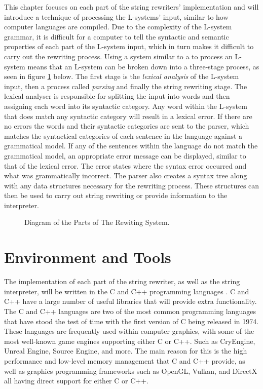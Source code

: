 This chapter focuses on each part of the string rewriters' implementation and will introduce a technique of processing the L-systems' input, similar to how computer languages are compiled. Due to the complexity of the L-system grammar, it is difficult for a computer to tell the syntactic and semantic properties of each part of the L-system input, which in turn makes it difficult to carry out the rewriting process. Using a system similar to a  to process an L-system means that an L-system  can be broken down into a three-stage process, as seen in figure \ref{3D rotations} below. The first stage is the \textit{lexical analysis} of the L-system input, then a process called \textit{parsing} and finally the string rewriting stage. The lexical analyser is responsible for splitting the input into words and then assigning each word into its syntactic category. Any word within the L-system that does match any syntactic category will result in a lexical error. If there are no errors the words and their syntactic categories are sent to the parser, which matches the syntactical categories of each sentence in the language against a grammatical model. If any of the sentences within the language do not match the grammatical model, an appropriate error message can be displayed, similar to that of the lexical error. The error states where the syntax error occurred and what was grammatically incorrect. The parser also creates a syntax tree along with any data structures necessary for the rewriting process. These structures can then be used to carry out string rewriting or provide information to the interpreter.

\begin{figure}[htbp]
	{\centering
		\setlength{\fboxrule}{1pt}
		\vspace{7px}
		\caption{Diagram of the Parts of The Rewiting System.} \label{3D rotations}
	}
\end{figure}
\FloatBarrier

\section{Environment and Tools}

The implementation of each part of the string rewriter, as well as the string interpreter, will be written in the C and C++ programming languages \cite{stroustrup2000c++}. C and C++ have a large number of useful libraries that will provide extra functionality. The C and C++ languages are two of the most common programming languages that have stood the test of time with the first version of C being released in 1974. These languages are frequently used within computer graphics, with some of the most well-known game engines supporting either C or C++. Such as CryEngine, Unreal Engine, Source Engine, and more. The main reason for this is the high performance and low-level memory management that C and C++ provide, as well as graphics programming frameworks such as OpenGL, Vulkan, and DirectX all having direct support for either C or C++. 

